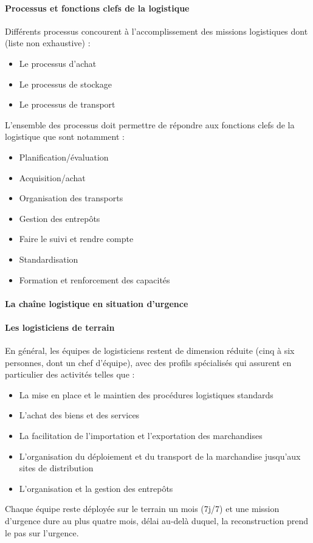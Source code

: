 \paragraph{Processus et fonctions clefs de la logistique}
Différents processus concourent à l'accomplissement des missions logistiques dont (liste non exhaustive) :
\begin{itemize}
\item Le processus d'achat
\item Le processus de stockage
\item Le processus de transport
\end{itemize}
L'ensemble des processus doit permettre de répondre aux fonctions clefs de la logistique que sont notamment :
\begin{itemize}
\item Planification/évaluation
\item Acquisition/achat
\item Organisation des transports
\item Gestion des entrepôts
\item Faire le suivi et rendre compte
\item Standardisation
\item Formation et renforcement des capacités
\end{itemize}

\paragraph{La chaîne logistique en situation d'urgence}

\paragraph{Les logisticiens de terrain}
En général, les équipes de logisticiens restent de dimension réduite (cinq à six personnes, dont un chef d'équipe), avec des profils spécialisés qui assurent en particulier des activités telles que :
\begin{itemize}
\item La mise en place et le maintien des procédures logistiques standards
\item L'achat des biens et des services
\item La facilitation de l'importation et l'exportation des marchandises
\item L'organisation du déploiement et du transport de la marchandise jusqu'aux sites de distribution
\item L'organisation et la gestion des entrepôts
\end{itemize}
Chaque équipe reste déployée sur le terrain un mois (7j/7) et une mission d'urgence dure au plus quatre mois, délai au-delà duquel, la reconstruction prend le pas sur l'urgence.

